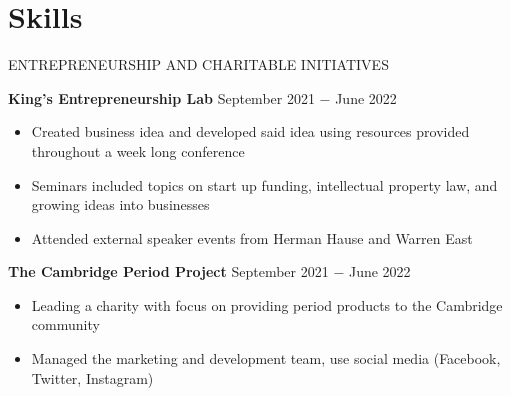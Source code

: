 \documentclass{article}
\begin{document}


\vspace{-0.75\baselineskip}
\hrulefill
\vspace{-0.75\baselineskip}

\clearpage
\section*{Skills}

\uppercase{Entrepreneurship and Charitable Initiatives}

\textbf{King's Entrepreneurship Lab} \hfill September 2021 $-$ June 2022
\begin{itemize}
    \item Created business idea and developed said idea using resources provided throughout a week long conference
    \item Seminars included topics on start up funding, intellectual property law, and growing ideas into businesses
    \item Attended external speaker events from Herman Hause and Warren East 
\end{itemize} \medskip

\textbf{The Cambridge Period Project} \hfill  September 2021 $-$  June 2022
\begin{itemize}
    \item Leading a charity with focus on providing period products to the Cambridge community
    \item Managed the marketing and development team, use social media (Facebook, Twitter, Instagram)
\end{itemize}\medskip
\end{document}
